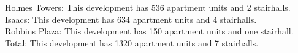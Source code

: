 {Holmes Towers}: This development has 536 apartment units and 2 stairhalls.\\{Isaacs}: This development has 634 apartment units and 4 stairhalls.\\{Robbins Plaza}: This development has 150 apartment units and one stairhall.\\{Total}: This development has 1320 apartment units and 7 stairhalls.\\